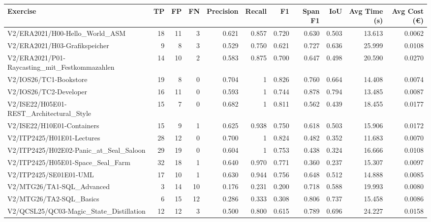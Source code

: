 \begin{tabular}{lrrrrrrrrrr}
Exercise & TP & FP & FN & Precision & Recall & F1 & Span F1 & IoU & Avg Time (s) & Avg Cost (€) \\
\hline
V2/ERA2021/H00-Hello\_World\_ASM & 18 & 11 & 3 & 0.621 & 0.857 & 0.720 & 0.630 & 0.503 & 13.613 & 0.0062 \\
V2/ERA2021/H03-Grafikspeicher & 9 & 8 & 3 & 0.529 & 0.750 & 0.621 & 0.727 & 0.636 & 25.999 & 0.0108 \\
V2/ERA2021/P01-Raycasting\_mit\_Festkommazahlen & 14 & 10 & 2 & 0.583 & 0.875 & 0.700 & 0.647 & 0.498 & 20.590 & 0.0270 \\
V2/IOS26/TC1-Bookstore & 19 & 8 & 0 & 0.704 & 1 & 0.826 & 0.760 & 0.664 & 14.408 & 0.0074 \\
V2/IOS26/TC2-Developer & 16 & 11 & 0 & 0.593 & 1 & 0.744 & 0.878 & 0.794 & 13.485 & 0.0087 \\
V2/ISE22/H05E01-REST\_Architectural\_Style & 15 & 7 & 0 & 0.682 & 1 & 0.811 & 0.562 & 0.439 & 18.455 & 0.0177 \\
V2/ISE22/H10E01-Containers & 15 & 9 & 1 & 0.625 & 0.938 & 0.750 & 0.618 & 0.503 & 15.906 & 0.0172 \\
V2/ITP2425/H01E01-Lectures & 28 & 12 & 0 & 0.700 & 1 & 0.824 & 0.482 & 0.352 & 11.683 & 0.0070 \\
V2/ITP2425/H02E02-Panic\_at\_Seal\_Saloon & 29 & 19 & 0 & 0.604 & 1 & 0.753 & 0.438 & 0.324 & 16.666 & 0.0108 \\
V2/ITP2425/H05E01-Space\_Seal\_Farm & 32 & 18 & 1 & 0.640 & 0.970 & 0.771 & 0.360 & 0.237 & 15.307 & 0.0097 \\
V2/ITP2425/SE01E01-UML & 17 & 10 & 1 & 0.630 & 0.944 & 0.756 & 0.648 & 0.512 & 14.888 & 0.0085 \\
V2/MTG26/TA1-SQL\_Advanced & 3 & 14 & 10 & 0.176 & 0.231 & 0.200 & 0.718 & 0.588 & 19.993 & 0.0080 \\
V2/MTG26/TA2-SQL\_Basics & 6 & 15 & 12 & 0.286 & 0.333 & 0.308 & 0.806 & 0.737 & 15.458 & 0.0086 \\
V2/QCSL25/QC03-Magic\_State\_Distillation & 12 & 12 & 3 & 0.500 & 0.800 & 0.615 & 0.789 & 0.696 & 24.227 & 0.0158 \\
\end{tabular}
